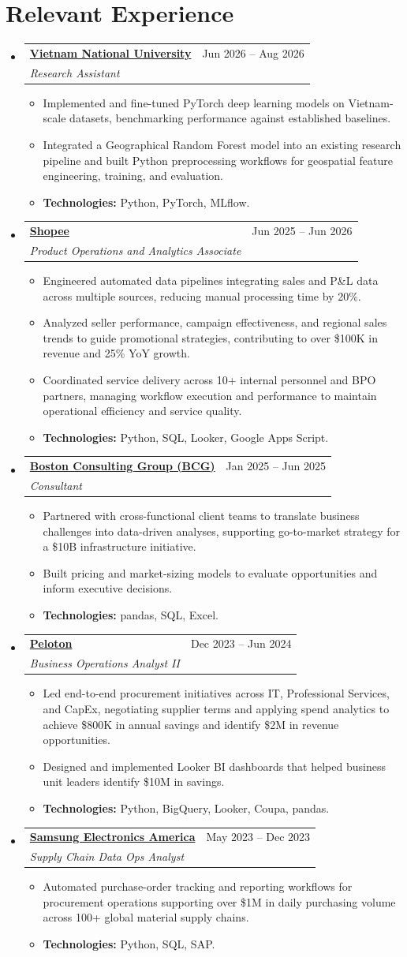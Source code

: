 \documentclass[a4paper,11pt]{article}
\makeatletter
\newcommand{\resumeItem}[1]{
  \item\small{
    {#1\par\vspace{-2pt}}
  }
}
\newcommand{\resumeSubheading}[4]{
  \vspace{-2pt}\item
    \begin{tabular*}{0.97\textwidth}[t]{l@{\extracolsep{\fill}}r}
      \textbf{#1} & #2 \\
      \textit{\small#3} & \textit{\small #4} \\
    \end{tabular*}\vspace{-7pt}
}
\newcommand{\resumeSubHeadingListStart}{\begin{itemize}[leftmargin=0.15in, label={}]}
\newcommand{\resumeSubHeadingListEnd}{\end{itemize}}
\newcommand{\resumeItemListStart}{\begin{itemize}}
\newcommand{\resumeItemListEnd}{\end{itemize}\vspace{-5pt}}
\makeatother
\begin{document}
\section{Relevant Experience}
\resumeSubHeadingListStart
  \resumeSubheading
    {\href{https://en.vnu.edu.vn/}{Vietnam National University}}{Jun 2026 -- Aug 2026}
    {Research Assistant}{}
    \resumeItemListStart
      \resumeItem{Implemented and fine-tuned PyTorch deep learning models on Vietnam-scale datasets, benchmarking performance against established baselines.}
      \resumeItem{Integrated a Geographical Random Forest model into an existing research pipeline and built Python preprocessing workflows for geospatial feature engineering, training, and evaluation.}
      \resumeItem{\textbf{Technologies:} Python, PyTorch, MLflow.}
    \resumeItemListEnd
  \resumeSubheading
    {\href{https://www.sea.com/products/shopee}{Shopee}}{Jun 2025 -- Jun 2026}
    {Product Operations and Analytics Associate}{}
    \resumeItemListStart
      \resumeItem{Engineered automated data pipelines integrating sales and P\&L data across multiple sources, reducing manual processing time by 20\%.}
      \resumeItem{Analyzed seller performance, campaign effectiveness, and regional sales trends to guide promotional strategies, contributing to over \$100K in revenue and 25\% YoY growth.}
      \resumeItem{Coordinated service delivery across 10+ internal personnel and BPO partners, managing workflow execution and performance to maintain operational efficiency and service quality.}
      \resumeItem{\textbf{Technologies:} Python, SQL, Looker, Google Apps Script.}
    \resumeItemListEnd
  \resumeSubheading
    {\href{https://www.bcg.com/about/overview}{Boston Consulting Group (BCG)}}{Jan 2025 -- Jun 2025}
    {Consultant}{}
    \resumeItemListStart
      \resumeItem{Partnered with cross-functional client teams to translate business challenges into data-driven analyses, supporting go-to-market strategy for a \$10B infrastructure initiative.}
      \resumeItem{Built pricing and market-sizing models to evaluate opportunities and inform executive decisions.}
      \resumeItem{\textbf{Technologies:} pandas, SQL, Excel.}
    \resumeItemListEnd
  \resumeSubheading
    {\href{https://www.onepeloton.com/company}{Peloton}}{Dec 2023 -- Jun 2024}
    {Business Operations Analyst II}{}
    \resumeItemListStart
      \resumeItem{Led end-to-end procurement initiatives across IT, Professional Services, and CapEx, negotiating supplier terms and applying spend analytics to achieve \$800K in annual savings and identify \$2M in revenue opportunities.}
      \resumeItem{Designed and implemented Looker BI dashboards that helped business unit leaders identify \$10M in savings.}
      \resumeItem{\textbf{Technologies:} Python, BigQuery, Looker, Coupa, pandas.}
    \resumeItemListEnd
  \resumeSubheading
    {\href{https://www.samsung.com/us/about-us/our-business/}{Samsung Electronics America}}{May 2023 -- Dec 2023}
    {Supply Chain Data Ops Analyst}{}
    \resumeItemListStart
      \resumeItem{Automated purchase-order tracking and reporting workflows for procurement operations supporting over \$1M in daily purchasing volume across 100+ global material supply chains.}
      \resumeItem{\textbf{Technologies:} Python, SQL, SAP.}
    \resumeItemListEnd
\resumeSubHeadingListEnd
\end{document}
